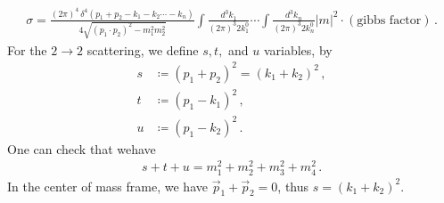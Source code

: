 \documentclass[11pt, onesided]{book}
\theoremstyle{break}
\theoremstyle{break}
\begin{document}
\begin{align*}
\sigma =  \frac{(2\pi)^4 \, \delta^4(p_1 +p_2 - k_1-k_2 \cdots-k_n)}{4\sqrt{(p_1\cdot p_2)^2 - m_1^2 m_2^2}} \int \frac{d^3k_1}{(2\pi)^3 2k_1^0}\cdots \int \frac{d^3k_n}{(2\pi)^3 2k_n^0} |m|^2 \cdot (\text{gibbs factor})\,.
\end{align*}
For the $2\to 2$ scattering, we define $s,t,$ and $u$ variables, by
\begin{align*}
s &\coloneqq (p_1 + p_2)^2 = (k_1 + k_2)^2 \,,\\
t&\coloneqq (p_1-k_1)^2\,,\\
u &\coloneqq (p_1 - k_2)^2\,.
\end{align*}
One can check that wehave
\begin{align*}
s+t + u = m_1^2 + m_2^2 + m_3^2 + m_4^2\,.
\end{align*}
In the center of mass frame, we have $\vec{p}_1 + \vec{p}_2 = 0$, thus $s = (k_1 + k_2)^2$. \\
\end{document}
